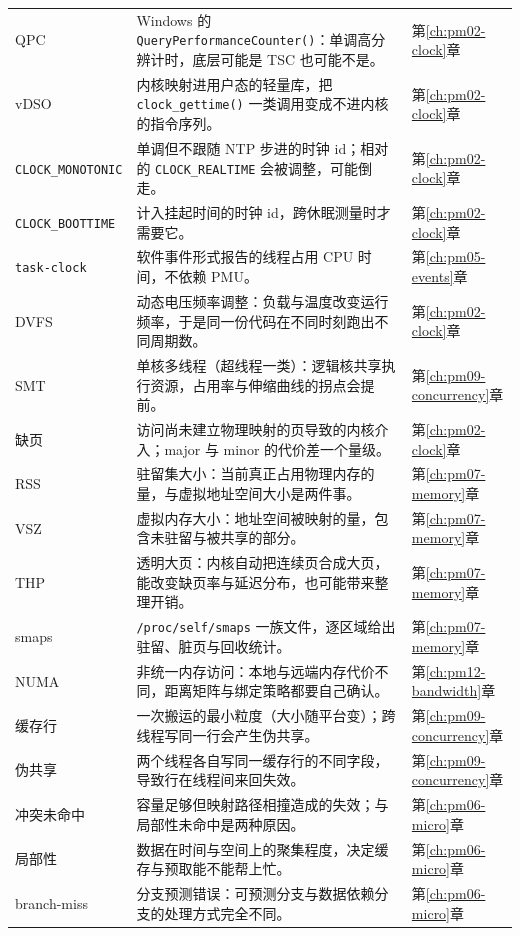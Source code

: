 \documentclass[12pt,a4paper,fontset=fandol]{ctexbook}
\newcommand{\Fn}[1]{\texttt{#1()}}
\newcommand{\Tp}[1]{\texttt{#1}}
\newcommand{\Bk}{\discretionary{}{}{}}
\newcommand{\Mx}[1]{\textsf{#1}}
\begin{document}
\begin{longtable}{>{\raggedright\arraybackslash}p{}
                  >{\raggedright\arraybackslash}p{}
                  >{\raggedright\arraybackslash}p{}}
QPC & Windows 的 \Fn{QueryPerformance{\Bk}Counter}：单调高分辨计时，底层可能是 TSC 也可能不是。 & 第\ref{ch:pm02-clock}章 \\
vDSO & 内核映射进用户态的轻量库，把 \Fn{clock\_{\Bk}gettime} 一类调用变成不进内核的指令序列。 & 第\ref{ch:pm02-clock}章 \\
\Tp{CLOCK\_{\Bk}MONOTONIC} & 单调但不跟随 NTP 步进的时钟 id；相对的 \Tp{CLOCK\_{\Bk}REALTIME} 会被调整，可能倒走。 & 第\ref{ch:pm02-clock}章 \\
\Tp{CLOCK\_{\Bk}BOOTTIME} & 计入挂起时间的时钟 id，跨休眠测量时才需要它。 & 第\ref{ch:pm02-clock}章 \\
\Tp{task{\Bk}-clock} & 软件事件形式报告的线程占用 CPU 时间，不依赖 PMU。 & 第\ref{ch:pm05-events}章 \\
DVFS & 动态电压频率调整：负载与温度改变运行频率，于是同一份代码在不同时刻跑出不同周期数。 & 第\ref{ch:pm02-clock}章 \\
SMT & 单核多线程（超线程一类）：逻辑核共享执行资源，占用率与伸缩曲线的拐点会提前。 & 第\ref{ch:pm09-concurrency}章 \\
缺页 & 访问尚未建立物理映射的页导致的内核介入；major 与 minor 的代价差一个量级。 & 第\ref{ch:pm02-clock}章 \\
\Mx{RSS} & 驻留集大小：当前真正占用物理内存的量，与虚拟地址空间大小是两件事。 & 第\ref{ch:pm07-memory}章 \\
\Mx{VSZ} & 虚拟内存大小：地址空间被映射的量，包含未驻留与被共享的部分。 & 第\ref{ch:pm07-memory}章 \\
\Mx{THP} & 透明大页：内核自动把连续页合成大页，能改变缺页率与延迟分布，也可能带来整理开销。 & 第\ref{ch:pm07-memory}章 \\
\Mx{smaps} & \Tp{/proc/self/{\Bk}smaps} 一族文件，逐区域给出驻留、脏页与回收统计。 & 第\ref{ch:pm07-memory}章 \\
NUMA & 非统一内存访问：本地与远端内存代价不同，距离矩阵与绑定策略都要自己确认。 & 第\ref{ch:pm12-bandwidth}章 \\
缓存行 & 一次搬运的最小粒度（大小随平台变）；跨线程写同一行会产生伪共享。 & 第\ref{ch:pm09-concurrency}章 \\
伪共享 & 两个线程各自写同一缓存行的不同字段，导致行在线程间来回失效。 & 第\ref{ch:pm09-concurrency}章 \\
冲突未命中 & 容量足够但映射路径相撞造成的失效；与局部性未命中是两种原因。 & 第\ref{ch:pm06-micro}章 \\
局部性 & 数据在时间与空间上的聚集程度，决定缓存与预取能不能帮上忙。 & 第\ref{ch:pm06-micro}章 \\
\Mx{branch-miss} & 分支预测错误：可预测分支与数据依赖分支的处理方式完全不同。 & 第\ref{ch:pm06-micro}章 \\

\end{longtable}
\end{document}
